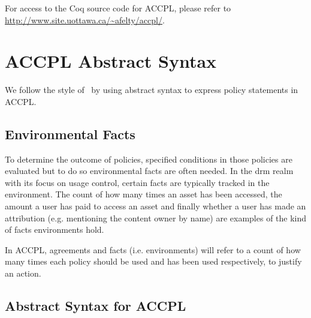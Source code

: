 \documentclass[runningheads,a4paper]{llncs}
\begin{document}
For access to the Coq source code for \ac{ACCPL}, please refer to \url{http://www.site.uottawa.ca/~afelty/accpl/}.

\section{ACCPL Abstract Syntax}

We follow the style of~\cite{pucella2006} by using abstract syntax to express policy statements in \ac{ACCPL}. 

\subsection{Environmental Facts}\label{sec:odrl0}
To determine the outcome of policies, specified conditions in those policies are evaluated but to do so environmental facts are often needed. In the \ac{drm} realm with its focus on usage control, certain facts are typically tracked in the environment. The count of how many times an asset has been accessed, the amount a user has paid to access an asset and finally whether a user has made an attribution (e.g. mentioning the content owner by name) are examples of the kind of facts environments hold.

In \ac{ACCPL}, agreements and facts (i.e. environments) will refer to a count of how many times each policy should be used and has been used respectively, to justify an action. 

\subsection{Abstract Syntax for ACCPL} \label{sec:productionast}
\end{document}
